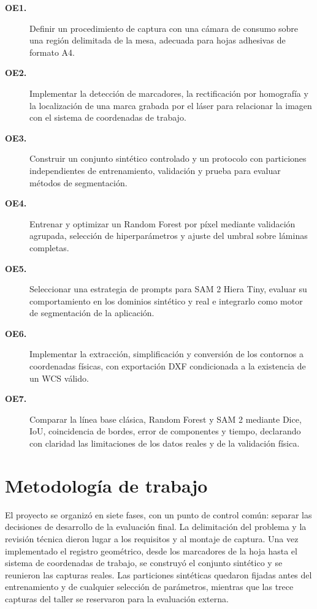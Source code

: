 \begin{description}
    \item[\textbf{OE1.}] Definir un procedimiento de captura con una cámara de consumo sobre una región delimitada de la mesa, adecuada para hojas adhesivas de formato A4.

    \item[\textbf{OE2.}] Implementar la detección de marcadores, la rectificación por homografía y la localización de una marca grabada por el láser para relacionar la imagen con el sistema de coordenadas de trabajo.

    \item[\textbf{OE3.}] Construir un conjunto sintético controlado y un protocolo con particiones independientes de entrenamiento, validación y prueba para evaluar métodos de segmentación.

    \item[\textbf{OE4.}] Entrenar y optimizar un Random Forest por píxel mediante validación agrupada, selección de hiperparámetros y ajuste del umbral sobre láminas completas.

    \item[\textbf{OE5.}] Seleccionar una estrategia de prompts para SAM 2 Hiera Tiny, evaluar su comportamiento en los dominios sintético y real e integrarlo como motor de segmentación de la aplicación.

    \item[\textbf{OE6.}] Implementar la extracción, simplificación y conversión de los contornos a coordenadas físicas, con exportación DXF condicionada a la existencia de un WCS válido.

    \item[\textbf{OE7.}] Comparar la línea base clásica, Random Forest y SAM 2 mediante Dice, IoU, coincidencia de bordes, error de componentes y tiempo, declarando con claridad las limitaciones de los datos reales y de la validación física.
\end{description}

\section{Metodología de trabajo}

El proyecto se organizó en siete fases, con un punto de control común: separar las decisiones de desarrollo de la evaluación final. La delimitación del problema y la revisión técnica dieron lugar a los requisitos y al montaje de captura. Una vez implementado el registro geométrico, desde los marcadores de la hoja hasta el sistema de coordenadas de trabajo, se construyó el conjunto sintético y se reunieron las capturas reales. Las particiones sintéticas quedaron fijadas antes del entrenamiento y de cualquier selección de parámetros, mientras que las trece capturas del taller se reservaron para la evaluación externa.

